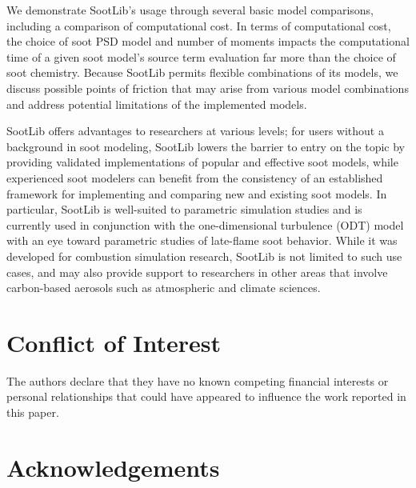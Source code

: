 \documentclass[preprint,letterpaper]{elsarticle}
\begin{document}
We demonstrate SootLib's usage through several basic model comparisons, including a comparison of computational cost. In terms of computational cost, the choice of soot PSD model and number of moments impacts the computational time of a given soot model's source term evaluation far more than the choice of soot chemistry. Because SootLib permits flexible combinations of its models, we discuss possible points of friction that may arise from various model combinations and address potential limitations of the implemented models.

SootLib offers advantages to researchers at various levels; for users without a background in soot modeling, SootLib lowers the barrier to entry on the topic by providing validated implementations of popular and effective soot models, while experienced soot modelers can benefit from the consistency of an established framework for implementing and comparing new and existing soot models. In particular, SootLib is well-suited to parametric simulation studies and is currently used in conjunction with the one-dimensional turbulence (ODT) model with an eye toward parametric studies of late-flame soot behavior. While it was developed for combustion simulation research, SootLib is not limited to such use cases, and may also provide support to researchers in other areas that involve carbon-based aerosols such as atmospheric and climate sciences.


\section{Conflict of Interest}


The authors declare that they have no known competing financial interests or personal relationships that could have appeared to influence the work reported in this paper.


\section*{Acknowledgements}
\end{document}
